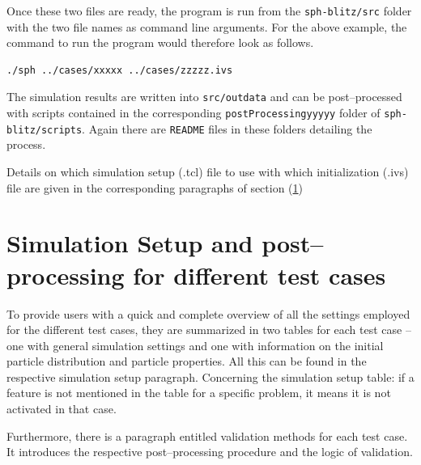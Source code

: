 \documentclass[11pt,a4paper,twoside]{report}
\begin{document}
Once these two files are ready, the program is run from the {\tt sph-blitz/src} folder with the two file names as command line arguments. For the above example, the command to run the program would therefore look as follows.
\begin{verbatim}
./sph ../cases/xxxxx ../cases/zzzzz.ivs
\end{verbatim}
The simulation results are written into {\tt src/outdata} and can be post--processed with scripts contained in the corresponding {\tt postProcessingyyyyy} folder of {\tt sph-blitz/scripts}. Again there are {\tt README} files in these folders detailing the process.

Details on which simulation setup (.tcl) file to use with which initialization (.ivs) file are given in the corresponding paragraphs of section (\ref{sec:simuSetupTestCases})


\section{Simulation Setup and post--processing for different test cases}
\label{sec:simuSetupTestCases}
To provide users with a quick and complete overview of all the settings employed for the different test cases, they are summarized in two tables for each test case -- one with general simulation settings and one with information on the initial particle distribution and particle properties. All this can be found in the respective simulation setup paragraph. 
Concerning the simulation setup table: if a feature is not mentioned in the table for a specific problem, it means it is not activated in that case. 

Furthermore, there is a paragraph entitled validation methods for each test case. It introduces the respective post--processing procedure and the logic of validation. 
\end{document}
